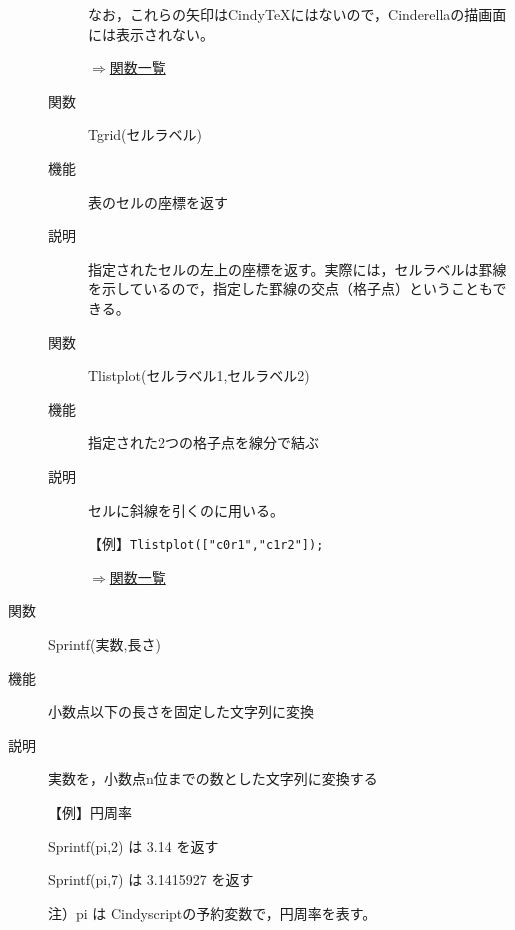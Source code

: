 \documentclass[papersize,a4paper,12pt,uplatex]{jsarticle}
\begin{document}
\begin{description}
\begin{description}
なお，これらの矢印はCindyTeXにはないので，Cinderellaの描画面には表示されない。

\begin{flushright}  \hyperlink{functionlist}{$\Rightarrow$関数一覧}\end{flushright}
  
\vspace{\baselineskip}
\hypertarget{tgrid}{}
\item[関数]  Tgrid(セルラベル)
\item[機能]  表のセルの座標を返す
\item[説明]  指定されたセルの左上の座標を返す。実際には，セルラベルは罫線を示しているので，指定した罫線の交点（格子点）ということもできる。

\vspace{\baselineskip}
\hypertarget{tlistplot}{}
\item[関数]  Tlistplot(セルラベル1,セルラベル2)
\item[機能]  指定された2つの格子点を線分で結ぶ
\item[説明]  セルに斜線を引くのに用いる。

\vspace{\baselineskip}
【例】\verb|Tlistplot(["c0r1","c1r2"]);| 
    
\vspace{\baselineskip}
\begin{flushright}  \hyperlink{functionlist}{$\Rightarrow$関数一覧}\end{flushright}

\end{description}

\newpage


\vspace{\baselineskip}
\hypertarget{sprintf}{}
\item[関数]  Sprintf(実数,長さ)
\item[機能]  小数点以下の長さを固定した文字列に変換
\item[説明]  実数を，小数点n位までの数とした文字列に変換する

\vspace{\baselineskip}
【例】円周率

 Sprintf(pi,2) は 3.14 を返す

 Sprintf(pi,7) は 3.1415927 を返す
    
注）pi は Cindyscriptの予約変数で，円周率を表す。\vspace{\baselineskip}




\end{description}
\end{document}
